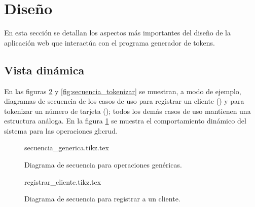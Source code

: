 %
%

\section{Diseño}

En esta sección se detallan los aspectos más importantes del diseño de la
aplicación web que interactúa con el programa generador de tokens.

\subsection{Vista dinámica}

En las figuras \ref{fig:secuencia_registrar_cliente} y
\ref{fig:secuencia_tokenizar} se muestran, a modo de ejemplo, diagramas de
secuencia de los casos de uso para registrar un cliente
() y para tokenizar un número de tarjeta
(); todos los demás casos de uso mantienen una
estructura análoga. En la figura \ref{fig:secuencia_generia} se muestra el
comportamiento dinámico del sistema para las operaciones \gls{gl:crud}.

\begin{figure}
  \begin{center}
    {secuencia_generica.tikz.tex}
    \caption{Diagrama de secuencia para operaciones genéricas.}
    \label{fig:secuencia_generia}
  \end{center}
\end{figure}

\begin{figure}
  \begin{center}
    {registrar_cliente.tikz.tex}
    \caption{Diagrama de secuencia para registrar a un cliente.}
    \label{fig:secuencia_registrar_cliente}
  \end{center}
\end{figure}
